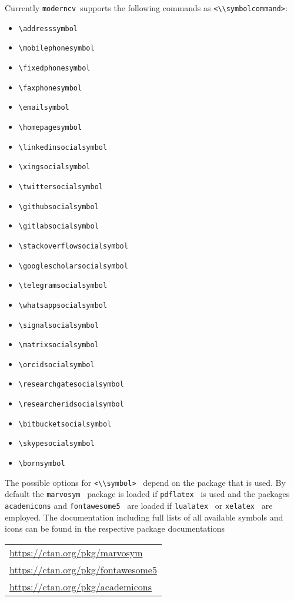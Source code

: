 \documentclass[a4paper,11pt]{article}
\newcommand{\code}[1]{\lstinline!#1!}
\newcommand{\Code}[1]{\lstinline!#1!~} %
\newcommand{\moderncv}{\code{moderncv}}
\begin{document}
Currently \moderncv\ supports the following commands as \code{<\\symbolcommand>}:
\begin{itemize}
  \item \lstinline!\addresssymbol!
  \item \lstinline!\mobilephonesymbol!
  \item \lstinline!\fixedphonesymbol!
  \item \lstinline!\faxphonesymbol!
  \item \lstinline!\emailsymbol!
  \item \lstinline!\homepagesymbol!
  \item \lstinline!\linkedinsocialsymbol!
  \item \lstinline!\xingsocialsymbol!
  \item \lstinline!\twittersocialsymbol!
  \item \lstinline!\githubsocialsymbol!
  \item \lstinline!\gitlabsocialsymbol!
  \item \lstinline!\stackoverflowsocialsymbol!
  \item \lstinline!\googlescholarsocialsymbol!
  \item \lstinline!\telegramsocialsymbol!
  \item \lstinline!\whatsappsocialsymbol!
  \item \lstinline!\signalsocialsymbol!
  \item \lstinline!\matrixsocialsymbol!
  \item \lstinline!\orcidsocialsymbol!
  \item \lstinline!\researchgatesocialsymbol!
  \item \lstinline!\researcheridsocialsymbol!
  \item \lstinline!\bitbucketsocialsymbol!
  \item \lstinline!\skypesocialsymbol!
  \item \lstinline!\bornsymbol!
\end{itemize}
The possible options for \Code{<\\symbol>} depend on the package that is used. 
By default the \Code{marvosym} package is loaded if \Code{pdflatex} is used and the packages 
\code{academicons} and \Code{fontawesome5} are loaded if \Code{lualatex} or \Code{xelatex} are 
employed. The documentation including full lists of all available symbols and icons can be found 
in the respective package documentations \medskip

\begin{tabular}{l}
  \url{https://ctan.org/pkg/marvosym}\\[1ex]
  \url{https://ctan.org/pkg/fontawesome5}\\[1ex]
  \url{https://ctan.org/pkg/academicons}
\end{tabular}
\end{document}
